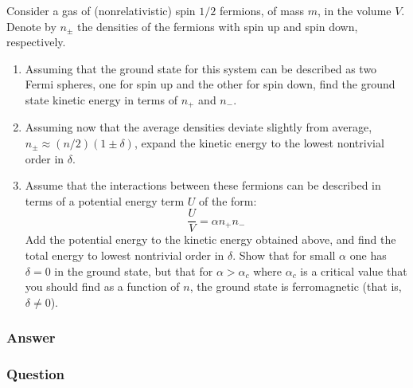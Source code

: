 Consider a gas of (nonrelativistic) spin $1/2$ fermions, of mass $m$, in the volume $V$. Denote by $n_\pm$ the densities of the fermions with spin up and spin down, respectively.
\begin{enumerate}
	\item Assuming that the ground state for this system can be described as two Fermi spheres, one for spin up and the other for spin down, find the ground state kinetic energy in terms of $n_+$ and $n_-$.
	\item Assuming now that the average densities deviate slightly from average, $n_\pm\approx(n/2)(1\pm\delta)$, expand the kinetic energy to the lowest nontrivial order in $\delta$.
	\item Assume that the interactions between these fermions can be described in terms of a potential energy term $U$ of the form:
	\begin{equation}
		\frac{U}{V} = \alpha n_+n_-
	\end{equation}
	Add the potential energy to the kinetic energy obtained above, and find the total energy to lowest nontrivial order in $\delta$. Show that for small $\alpha$ one has $\delta= 0$ in the ground state, but that for $\alpha>\alpha_c$ where $\alpha_c$ is a critical value that you should find as a function of $n$, the ground state is ferromagnetic (that is, $\delta \ne 0$).
\end{enumerate}

\subsubsection{Answer}


\subsubsection{Question}

